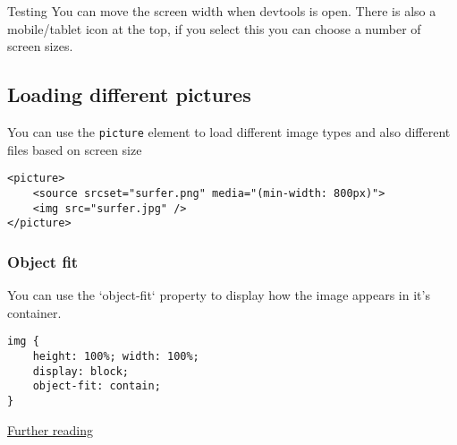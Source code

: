 \begin{infobox}{Testing}
    You can move the screen width when devtools is open. There is also a mobile/tablet icon at the top, if you select this you can choose a number of screen sizes.
\end{infobox}

\subsection{Loading different pictures}

You can use the \texttt{picture} element to load different image types and also different files based on screen size

\begin{verbatim}
<picture>
    <source srcset="surfer.png" media="(min-width: 800px)">
    <img src="surfer.jpg" />
</picture>
\end{verbatim}


\subsubsection{Object fit}

You can use the `object-fit` property to display how the image appears in it's container.

\begin{verbatim}
img {
    height: 100%; width: 100%;
    display: block;
    object-fit: contain;
}
\end{verbatim}

\href{https://developer.mozilla.org/en-US/docs/Web/HTML/Element/picture}{Further reading}